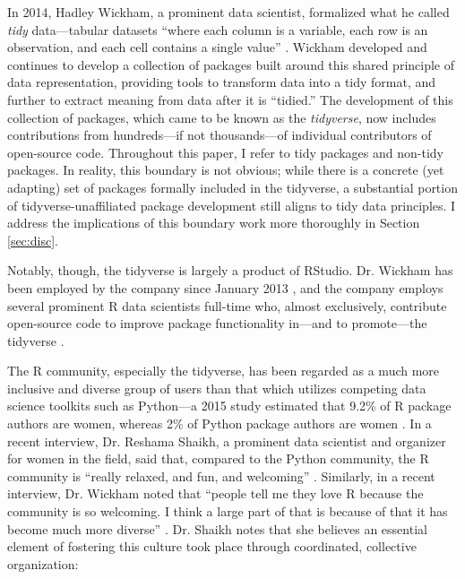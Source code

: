 In 2014, Hadley Wickham, a prominent data scientist, formalized what he called \textit{tidy} data---tabular datasets ``where each column is a variable, each row is an observation, and each cell contains a single value'' \cite{wickham2014tidy}. Wickham developed and continues to develop a collection of packages built around this shared principle of data representation, providing tools to transform data into a tidy format, and further to extract meaning from data after it is ``tidied.'' The development of this collection of packages, which came to be known as the \textit{tidyverse}, now includes contributions from hundreds---if not thousands---of individual contributors of open-source code. Throughout this paper, I refer to tidy packages and non-tidy packages. In reality, this boundary is not obvious; while there is a concrete (yet adapting) set of packages formally included in the tidyverse, a substantial portion of tidyverse-unaffiliated package development still aligns to tidy data principles. I address the implications of this boundary work more thoroughly in Section \ref{sec:disc}.

Notably, though, the tidyverse is largely a product of RStudio. Dr. Wickham has been employed by the company since January 2013 \cite{wickhamhadley}, and the company employs several prominent R data scientists full-time who, almost exclusively, contribute open-source code to improve package functionality in---and to promote---the tidyverse \cite{rstudiopackages, future_r_hadley}.

The R community, especially the tidyverse, has been regarded as a much more inclusive and diverse group of users than that which utilizes competing data science toolkits such as Python---a 2015 study estimated that 9.2\% of R package authors are women, whereas 2\% of Python package authors are women \cite{mair2015motivation}. In a recent interview, Dr. Reshama Shaikh, a prominent data scientist and organizer for women in the field, said that, compared to the Python community, the R community is ``really relaxed, and fun, and welcoming'' \cite{shaikhwomen2019}. Similarly, in a recent interview, Dr. Wickham noted that ``people tell me they love R because the community is so welcoming. I think a large part of that is because of that it has become much more diverse'' \cite{future_r_hadley}. Dr. Shaikh notes that she believes an essential element of fostering this culture took place through coordinated, collective organization:

